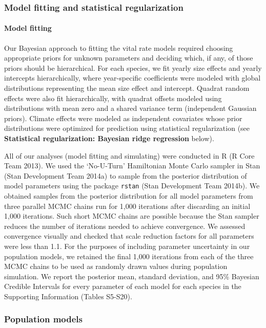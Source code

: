 \documentclass[12pt,]{article}
\begin{document}
\subsubsection{Model fitting and statistical
regularization}\label{model-fitting-and-statistical-regularization}

\paragraph{Model fitting}\label{model-fitting}

Our Bayesian approach to fitting the vital rate models required choosing
appropriate priors for unknown parameters and deciding which, if any, of
those priors should be hierarchical. For each species, we fit yearly
size effects and yearly intercepts hierarchically, where year-specific
coefficients were modeled with global distributions representing the
mean size effect and intercept. Quadrat random effects were also fit
hierarchically, with quadrat offsets modeled using distributions with
mean zero and a shared variance term (independent Gaussian priors).
Climate effects were modeled as independent covariates whose prior
distributions were optimized for prediction using statistical
regularization (see \textbf{Statistical regularization: Bayesian ridge
regression} below).

All of our analyses (model fitting and simulating) were conducted in R
(R Core Team 2013). We used the `No-U-Turn' Hamiltonian Monte Carlo
sampler in Stan (Stan Development Team 2014a) to sample from the
posterior distribution of model parameters using the package
\texttt{rstan} (Stan Development Team 2014b). We obtained samples from
the posterior distribution for all model parameters from three parallel
MCMC chains run for 1,000 iterations after discarding an initial 1,000
iterations. Such short MCMC chains are possible because the Stan sampler
reduces the number of iterations needed to achieve convergence. We
assessed convergence visually and checked that scale reduction factors
for all parameters were less than 1.1. For the purposes of including
parameter uncertainty in our population models, we retained the final
1,000 iterations from each of the three MCMC chains to be used as
randomly drawn values during population simulation. We report the
posterior mean, standard deviation, and 95\% Bayesian Credible Intervals
for every parameter of each model for each species in the Supporting
Information (Tables S5-S20).

\subsubsection{Population models}\label{population-models}
\end{document}
